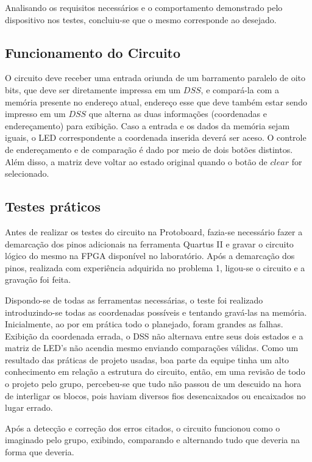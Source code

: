 \documentclass[12pt]{article}
\begin{document}
Analisando os requisitos necessários e o comportamento demonstrado pelo dispositivo nos testes, concluiu-se que o mesmo corresponde ao desejado.

\subsection{Funcionamento do Circuito}

O circuito deve receber uma entrada oriunda de um barramento paralelo de oito bits, que deve ser diretamente impressa em um $DSS$, e compará-la com a memória presente no endereço atual, endereço esse que deve também estar sendo impresso em um $DSS$ que alterna as duas informações (coordenadas e endereçamento) para exibição. Caso a entrada e os dados da memória sejam iguais, o LED correspondente a coordenada inserida deverá ser aceso. O controle de endereçamento e de comparação é dado por meio de dois botões distintos. Além disso, a matriz deve voltar ao estado original quando o botão de $clear$ for selecionado.


\subsection{Testes práticos}
Antes de realizar os testes do circuito na Protoboard, fazia-se necessário fazer a demarcação dos pinos adicionais na ferramenta Quartus II e  gravar o circuito lógico do mesmo na FPGA disponível no laboratório. Após a demarcação dos pinos, realizada com experiência adquirida no problema 1, ligou-se o circuito e a gravação foi feita.


Dispondo-se de todas as ferramentas necessárias, o teste foi realizado introduzindo-se todas as coordenadas possíveis e tentando gravá-las na memória. Inicialmente, ao por em prática todo o planejado, foram grandes as falhas. Exibição da coordenada errada, o DSS não alternava entre seus dois estados e a matriz de LED's não acendia mesmo enviando comparações válidas. Como um resultado das práticas de projeto usadas, boa parte da equipe tinha um alto conhecimento em relação a estrutura do circuito, então, em uma revisão de todo o projeto pelo grupo, percebeu-se que tudo não passou de um descuido na hora de interligar os blocos, pois haviam diversos fios desencaixados ou encaixados no lugar errado.

Após a detecção e correção dos erros citados, o circuito funcionou como o imaginado pelo grupo, exibindo, comparando e alternando tudo que deveria na forma que deveria.
\end{document}

